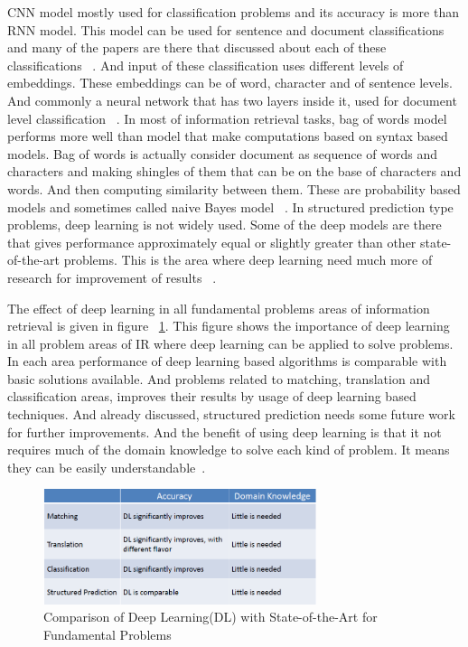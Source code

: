 \documentclass{doublecol-new}
\theoremstyle{TH}{
\newtheorem{lemma}{Lemma}
\newtheorem{theorem}[lemma]{Theorem}
\newtheorem{corrolary}[lemma]{Corrolary}
\newtheorem{conjecture}[lemma]{Conjecture}
\newtheorem{proposition}[lemma]{Proposition}
\newtheorem{claim}[lemma]{Claim}
\newtheorem{stheorem}[lemma]{Wrong Theorem}
\newtheorem{algorithm}{Algorithm}
}
\theoremstyle{THrm}{
\newtheorem{definition}{Definition}[section]
\newtheorem{question}{Question}[section]
\newtheorem{remark}{Remark}
\newtheorem{scheme}{Scheme}
}
\theoremstyle{THhit}{
\newtheorem{case}{Case}[section]
}
\begin{document}
CNN model mostly used for classification problems and its accuracy is more than RNN model. This model can be used for sentence and document classifications and many of the papers are there that discussed about each of these classifications ~\cite{kim2014convolutional,lai2015recurrent}. And input of these classification uses different levels of embeddings. These embeddings can be of word, character and of sentence levels. And commonly a neural network that has two layers inside it, used for document level classification ~\cite{yang2016hierarchical}. In most of information retrieval tasks, bag of words model performs more well than model that make computations based on syntax based models. Bag of words is actually consider document as sequence of words and characters and making shingles of them that can be on the base of characters and words. And then computing similarity between them. These are probability based models and sometimes called naive Bayes model ~\cite{iyyer2015deep}. In structured prediction type problems, deep learning  is not widely used. Some of the deep models are there that gives performance approximately equal or slightly greater than other state-of-the-art problems. This is the area where deep learning need much more of research for improvement of results ~\cite{andor2016globally}. 

The effect of deep learning in all fundamental problems areas of information retrieval is given in figure ~\ref{fig:dl-result}. This figure shows the importance of deep learning in all problem areas of IR where deep learning can be applied to solve problems. In each area performance of deep learning based algorithms is comparable with basic solutions available. And problems related to matching, translation and classification areas, improves their results by usage of deep learning based techniques. And already discussed, structured prediction needs some future work for further improvements. And the benefit of using deep learning is that it not requires much of the domain knowledge to solve each kind of problem. It means they can be easily understandable~\cite{huang2013learning}. 
\begin{figure}[h]
	\centerline{\includegraphics[width=8cm,keepaspectratio]{image/dl-IR-areas.PNG}}
	\caption{Comparison of Deep Learning(DL) with State-of-the-Art for Fundamental Problems}
	\label{fig:dl-result}
\end{figure}
\end{document}
